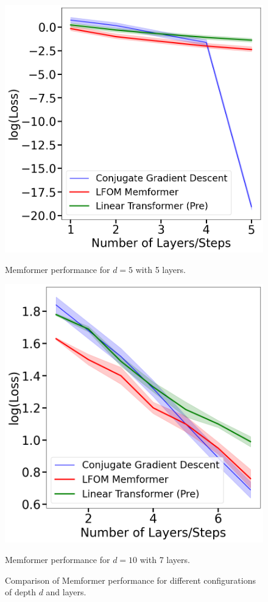 \documentclass[11pt]{article}
\theoremstyle{plain}
\theoremstyle{definition}
\theoremstyle{remark}
\numberwithin{equation}{section}
\begin{document}
\begin{figure}[htbp]
  \centering
  \begin{minipage}[b]{0.48\textwidth}
    \centering
    \includegraphics[width=\textwidth]{Layers=5d=5.png}
    \caption{Memformer performance for \( d = 5 \) with 5 layers.}
    \label{fig:layers5}
  \end{minipage}
  \hfill
  \begin{minipage}[b]{0.48\textwidth}
    \centering
    \includegraphics[width=\textwidth]{Layers=7d=10.png}
    \caption{Memformer performance for \( d = 10 \) with 7 layers.}
    \label{fig:layers7}
  \end{minipage}
  \caption{Comparison of Memformer performance for different configurations of depth \( d \) and layers.}
  \label{fig:layers_comparison}
\end{figure}
\end{document}
